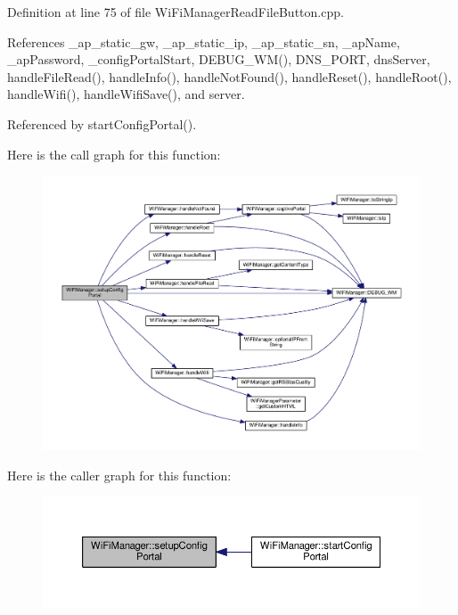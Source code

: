 Definition at line 75 of file Wi\+Fi\+Manager\+Read\+File\+Button.\+cpp.



References \+\_\+ap\+\_\+static\+\_\+gw, \+\_\+ap\+\_\+static\+\_\+ip, \+\_\+ap\+\_\+static\+\_\+sn, \+\_\+ap\+Name, \+\_\+ap\+Password, \+\_\+config\+Portal\+Start, D\+E\+B\+U\+G\+\_\+\+W\+M(), D\+N\+S\+\_\+\+P\+O\+RT, dns\+Server, handle\+File\+Read(), handle\+Info(), handle\+Not\+Found(), handle\+Reset(), handle\+Root(), handle\+Wifi(), handle\+Wifi\+Save(), and server.



Referenced by start\+Config\+Portal().

Here is the call graph for this function\+:\nopagebreak
\begin{figure}[H]
\begin{center}
\leavevmode
\includegraphics[width=350pt]{d4/dc8/class_wi_fi_manager_a1743325d0dd86d011df96b22d2a0ddd6_cgraph}
\end{center}
\end{figure}
Here is the caller graph for this function\+:\nopagebreak
\begin{figure}[H]
\begin{center}
\leavevmode
\includegraphics[width=350pt]{d4/dc8/class_wi_fi_manager_a1743325d0dd86d011df96b22d2a0ddd6_icgraph}
\end{center}
\end{figure}
\mbox{\label{class_wi_fi_manager_abcc403fc26a47f7a111d1271f1d0869e}} 
